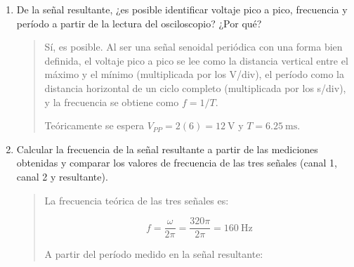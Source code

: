 \documentclass{article}
\begin{document}
\begin{enumerate}
\begin{enumerate}[label=\alph*)]
            \begin{quote}
                Sí, la señal resultante es senoidal. Como ambas señales tienen la misma frecuencia y la misma fase, su suma es otra senoide de igual frecuencia, cuya amplitud es la suma de las amplitudes:

                \[
                    V_1(t) + V_2(t) = 2\sin(320\pi t) + 4\sin(320\pi t) = 6\sin(320\pi t)\ \si{\volt}
                \]

                Es decir, la señal resultante está en fase con las originales y tiene una amplitud mayor, $V_P = \SI{6}{\volt}$. Esto concuerda con la propiedad de las señales senoidales mencionada en el marco teórico.
            \end{quote}

            \item De la señal resultante, ¿es posible identificar voltaje pico a pico, frecuencia y período a partir de la lectura del osciloscopio? ¿Por qué?

            \begin{quote}
                Sí, es posible. Al ser una señal senoidal periódica con una forma bien definida, el voltaje pico a pico se lee como la distancia vertical entre el máximo y el mínimo (multiplicada por los V/div), el período como la distancia horizontal de un ciclo completo (multiplicada por los s/div), y la frecuencia se obtiene como $f = 1/T$.

                Teóricamente se espera $V_{PP} = 2(6) = \SI{12}{\volt}$ y $T = \SI{6.25}{\milli\second}$.
            \end{quote}

            \item Calcular la frecuencia de la señal resultante a partir de las mediciones obtenidas y comparar los valores de frecuencia de las tres señales (canal 1, canal 2 y resultante).

            \begin{quote}
                La frecuencia teórica de las tres señales es:

                \[
                    f = \frac{\omega}{2\pi} = \frac{320\pi}{2\pi} = \SI{160}{\hertz}
                \]

                A partir del período medido en la señal resultante:


\end{quote}
\end{enumerate}
\end{enumerate}
\end{document}

